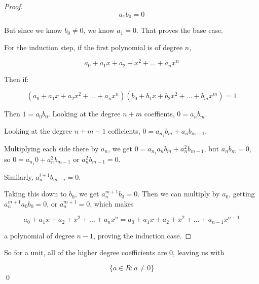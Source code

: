 \documentclass[11pt,oneside]{article}
\numberwithin{equation}{section}
\theoremstyle{definition}
\begin{document}
\begin{solution}
\begin{proof}
    $$
    a_1 b_0 = 0
    $$
    
    But since we know $b_0 \neq 0$, we know $a_1 = 0$.  That proves the base case.

    For the induction step, if the first polynomial is of degree $n$,

    $$
    a_0 + a_1 x + a_2 + x^2 + ... + a_n x^ n
    $$

    Then if:

    $$
    (a_0 + a_1 x + a_2 x^2 + ... + a_n x^ n) (b_0 + b_1 x + b_2 x^2 + ... + b_m x^ m) = 1
    $$

    Then $1 = a_0 b_0$. Looking at the degree $n+m$ coeffients, $0 = a_n b_m$.

    Looking at the degree $n+m -1$ cofficients, $0 = a_{n_1} b_m + a_n b_{m-1}$.

    Multiplying each side there by $a_n$, we get $0 = a_{n_1} a_n b_m + a_n ^2 b_{m-1}$, but $a_n b_m = 0$, so
    $ 0 = a_{n_1} 0 + a_n^2 b_{m-1}$ or $a_n^2 b_{m-1} = 0$.

    Similarly, $ a_n^{i +1} b_{m - i} = 0$.

    Taking this down to $b_0$, we get $a_n^{m+1} b_0 = 0$.  Then we can multiply by $a_0$, getting
    $ a_n^{m+1} a_0 b_0 = 0$, or $a_n^{m+1} = 0$, which makes

    $$
    a_0 + a_1 x + a_2 + x^2 + ... + a_n x^ n = a_0 + a_1 x + a_2 + x^2 + ... + a_{n-1} x^ {n-1}
    $$

    a polynomial of degree $n-1$, proving the induction case.  
  \end{proof}

  So for a unit, all of the higher degree coefficients are 0, leaving us with

  $$
  \{ a \in R: a \neq 0 \}
  $$
  \qed
  
\end{solution}
\end{document}
